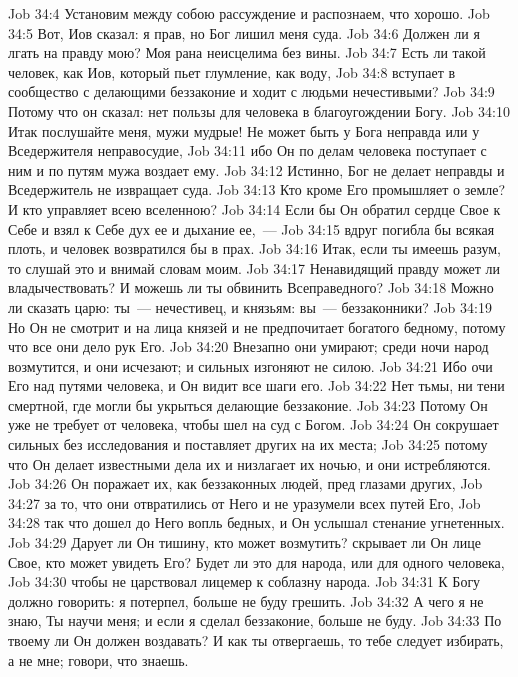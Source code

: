 \vs Job 34:4 Установим между собою рассуждение и распознаем, что хорошо.
\vs Job 34:5 Вот, Иов сказал: я прав, но Бог лишил меня суда.
\vs Job 34:6 Должен ли я лгать на правду мою? Моя рана неисцелима без вины.
\vs Job 34:7 Есть ли такой человек, как Иов, который пьет глумление, как воду,
\vs Job 34:8 вступает в сообщество с делающими беззаконие и ходит с людьми нечестивыми?
\vs Job 34:9 Потому что он сказал: нет пользы для человека в благоугождении Богу.
\vs Job 34:10 Итак послушайте меня, мужи мудрые! Не может быть у Бога неправда или у Вседержителя неправосудие,
\vs Job 34:11 ибо Он по делам человека поступает с ним и по путям мужа воздает ему.
\vs Job 34:12 Истинно, Бог не делает неправды и Вседержитель не извращает суда.
\vs Job 34:13 Кто кроме Его промышляет о земле? И кто управляет всею вселенною?
\vs Job 34:14 Если бы Он обратил сердце Свое к Себе и взял к Себе дух ее и дыхание ее,~---
\vs Job 34:15 вдруг погибла бы всякая плоть, и человек возвратился бы в прах.
\vs Job 34:16 Итак, если ты имеешь разум, то слушай это и внимай словам моим.
\vs Job 34:17 Ненавидящий правду может ли владычествовать? И можешь ли ты обвинить Всеправедного?
\vs Job 34:18 Можно ли сказать царю: ты~--- нечестивец, и князьям: вы~--- беззаконники?
\vs Job 34:19 Но Он не смотрит и на лица князей и не предпочитает богатого бедному, потому что все они дело рук Его.
\vs Job 34:20 Внезапно они умирают; среди ночи народ возмутится, и они исчезают; и сильных изгоняют не силою.
\vs Job 34:21 Ибо очи Его над путями человека, и Он видит все шаги его.
\vs Job 34:22 Нет тьмы, ни тени смертной, где могли бы укрыться делающие беззаконие.
\vs Job 34:23 Потому Он уже не требует от человека, чтобы шел на суд с Богом.
\vs Job 34:24 Он сокрушает сильных без исследования и поставляет других на их места;
\vs Job 34:25 потому что Он делает известными дела их и низлагает их ночью, и они истребляются.
\vs Job 34:26 Он поражает их, как беззаконных людей, пред глазами других,
\vs Job 34:27 за то, что они отвратились от Него и не уразумели всех путей Его,
\vs Job 34:28 так что дошел до Него вопль бедных, и Он услышал стенание угнетенных.
\vs Job 34:29 Дарует ли Он тишину, кто может возмутить? скрывает ли Он лице Свое, кто может увидеть Его? Будет ли это для народа, или для одного человека,
\vs Job 34:30 чтобы не царствовал лицемер к соблазну народа.
\vs Job 34:31 К Богу должно говорить: я потерпел, больше не буду грешить.
\vs Job 34:32 А чего я не знаю, Ты научи меня; и если я сделал беззаконие, больше не буду.
\vs Job 34:33 По твоему ли  Он должен воздавать? И как ты отвергаешь, то тебе следует избирать, а не мне; говори, что знаешь.
